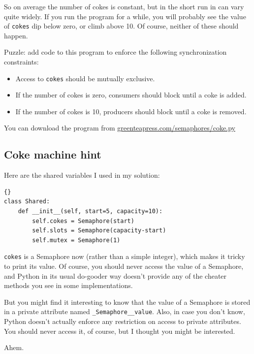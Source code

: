 \documentclass{book}
\newcommand{\clearemptydoublepage}{\newpage\cleardoublepage}
\begin{document}
So on average the number of cokes is constant, but in the short
run in can vary quite widely.  If you run the program for a
while, you will probably see the value of {\tt cokes} dip
below zero, or climb above 10.  Of course, neither of these
should happen.

Puzzle: add code to this program to enforce the following
synchronization constraints:

\begin{itemize}

\item Access to {\tt cokes} should be mutually exclusive.

\item If the number of cokes is zero, consumers should block
until a coke is added.

\item If the number of cokes is 10, producers should block
until a coke is removed.

\end{itemize}

You can download the program from
\url{greenteapress.com/semaphores/coke.py}


\clearemptydoublepage
\subsection {Coke machine hint}

Here are the shared variables I used in my solution:

\begin{lstlisting}[caption={}]{}
class Shared:
    def __init__(self, start=5, capacity=10):
        self.cokes = Semaphore(start)
        self.slots = Semaphore(capacity-start)
        self.mutex = Semaphore(1)
\end{lstlisting}

{\tt cokes} is a Semaphore now (rather than a simple integer), 
which makes it tricky to print its value.  Of course, you
should never access the value of a Semaphore, and Python in
its usual do-gooder way doesn't provide any of the cheater
methods you see in some implementations.

But you might find it interesting to know that the value
of a Semaphore is stored in a private attribute named
{\tt \_Semaphore\_\_value}.  Also, in case you don't know,
Python doesn't actually enforce any restriction on access to
private attributes.  You should never access it, of course,
but I thought you might be interested.

Ahem.
\end{document}
